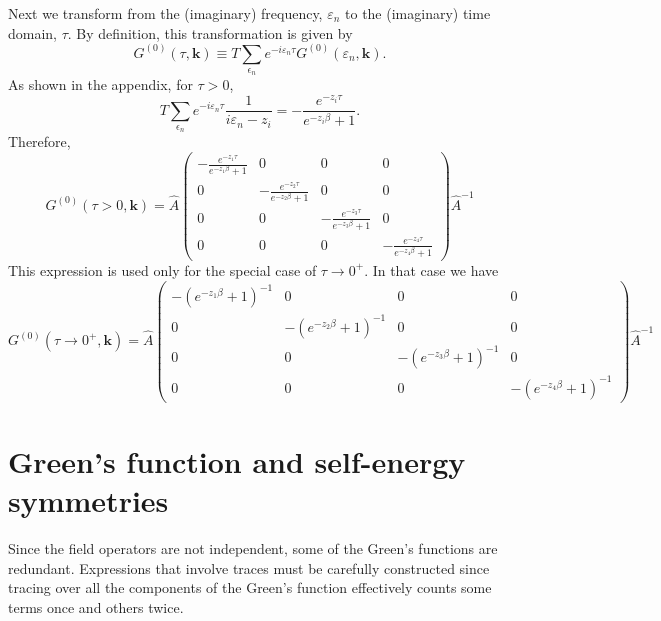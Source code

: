 Next we transform from the (imaginary) frequency, $\varepsilon_n$ to
the (imaginary) time domain, $\tau$.
By definition, this transformation is given
by
\begin{equation}
G^{(0)}(\tau,\mathbf{k}) \equiv T \sum_{\epsilon_n}
e^{-i \varepsilon_n \tau}G^{(0)}(\varepsilon_n,\mathbf{k}).
\end{equation}
As shown in the appendix, for $\tau > 0$,
\begin{equation}
 T \sum_{\epsilon_n}
e^{-i \varepsilon_n \tau} \frac{1}{i\varepsilon_n - z_i}
=  
 - \frac{e^{-z_i \tau}}
{e^{-z_i \beta} + 1}.
\end{equation}
Therefore,
\begin{equation}
G^{(0)}(\tau > 0,\mathbf{k}) = 
\hat{A} 
\begin{pmatrix}
- \frac{e^{-z_1 \tau}}
{e^{-z_1 \beta} + 1} & 0 & 0 & 0 \\
0 & - \frac{e^{-z_2 \tau}}
{e^{-z_2 \beta} + 1}
 & 0 & 0 \\
0 & 0 & - \frac{e^{-z_3 \tau}}
{e^{-z_3 \beta} + 1} & 0 \\
0 & 0 & 0 & - \frac{e^{-z_4 \tau}}
{e^{-z_4 \beta} + 1}
\end{pmatrix}
\hat{A}^{-1}
\end{equation}
This expression is used only for the special case
of $\tau \to 0^+$.  In that case we have
\begin{equation}
G^{(0)}(\tau \to 0^+,\mathbf{k}) = 
\hat{A} 
\begin{pmatrix}
- 
(e^{-z_1 \beta} + 1)^{-1} & 0 & 0 & 0 \\
0 & - (e^{-z_2 \beta} + 1)^{-1}  & 0 & 0 \\
0 & 0 & - (e^{-z_3 \beta} + 1)^{-1} & 0 \\
0 & 0 & 0 & - (e^{-z_4 \beta} + 1)^{-1}
\end{pmatrix}
\hat{A}^{-1}
\end{equation}

\section{Green's function and self-energy symmetries}

Since the field operators are not independent, some of 
the Green's functions are redundant.  Expressions that
involve traces must be carefully constructed since
tracing over all the components of the Green's function
effectively counts some terms once and others twice.

